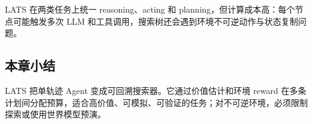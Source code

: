 

LATS 在两类任务上统一 reasoning、acting 和 planning，但计算成本高：每个节点可能触发多次 LLM 和工具调用，搜索树还会遇到环境不可逆动作与状态复制问题。

\subsection{本章小结}

LATS 把单轨迹 Agent 变成可回溯搜索器。它通过价值估计和环境 reward 在多条计划间分配预算，适合高价值、可模拟、可验证的任务；对不可逆环境，必须限制探索或使用世界模型预演。

